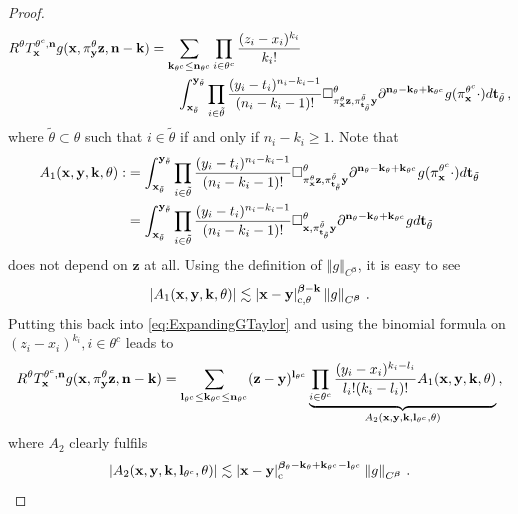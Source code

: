 \documentclass[12pt]{article}
\numberwithin{equation}{section}
\theoremstyle{plain}
\theoremstyle{definition}
\newcommand{\abs}[1]{\left\vert #1 \right\vert}
\newcommand{\norm}[1]{\left\Vert #1\right\Vert}
\def\fk{\mathbf k}\def\fl{\mathbf l}
\def\fy{\mathbf y}\def\fz{\mathbf z}
\def\fbeta{{\boldsymbol\beta}}
\begin{document}
\begin{proof}
    \begin{align}\begin{split}\label{eq:ExpandingGTaylor}
        R^\theta T_\fx^{\theta^c,\fn} g(\fx,\pi^\theta_\fy \fz,\fn-\fk) &= \sum_{\fk_{\theta^c}\le\fn_{\theta^c}} \prod_{i\in\theta^c} \frac{(z_i-x_i)^{k_i}}{k_i!} \\&\qquad\int_{\fx_{\tilde\theta}}^{\fy_{\tilde\theta}} \prod_{i\in\tilde\theta} \frac{(y_i-t_i)^{n_i-k_i-1}}{(n_i-k_i-1)!} \square^\theta_{\pi_\fx^\theta\fz,\pi_{\ft_{\tilde\theta}}^{\tilde\theta}\fy} \partial^{\fn_\theta-\fk_{\theta}+\fk_{\theta^c}}g(\pi_\fx^{\theta^c}\cdot)d\ft_{\tilde\theta}\,,
    \end{split}\end{align}
    where $\tilde\theta\subset\theta$ such that $i\in\tilde\theta$ if and only if $n_i-k_i\ge 1$. Note that
    \begin{align*}
        A_1(\fx,\fy,\fk,\theta) :&= \int_{\fx_{\tilde\theta}}^{\fy_{\tilde\theta}} \prod_{i\in\tilde\theta} \frac{(y_i-t_i)^{n_i-k_i-1}}{(n_i-k_i-1)!} \square^\theta_{\pi_\fx^\theta\fz,\pi_{\ft_{\tilde\theta}}^{\tilde\theta}\fy} \partial^{\fn_\theta-\fk_\theta+\fk_{\theta^c}}g(\pi_\fx^{\theta^c}\cdot)d\ft_{\tilde\theta}\\
        &=\int_{\fx_{\tilde\theta}}^{\fy_{\tilde\theta}} \prod_{i\in\tilde\theta} \frac{(y_i-t_i)^{n_i-k_i-1}}{(n_i-k_i-1)!} \square^\theta_{\fx,\pi_{\ft_{\tilde\theta}}^{\tilde\theta}\fy} \partial^{\fn_\theta-\fk_\theta+\fk_{\theta^c}}gd\ft_{\tilde\theta}
    \end{align*}
    does not depend on $\fz$ at all. Using the definition of $\norm{g}_{C^\fbeta}$, it is easy to see
    \[
        \abs{A_1(\fx,\fy,\fk,\theta)} \lesssim \abs{\fx-\fy}^{\fbeta-\fk}_{\text{c},\theta} \norm{g}_{C^\fbeta}\,.
    \]
    Putting this back into \eqref{eq:ExpandingGTaylor} and using the binomial formula on $(z_i-x_i)^{k_i}, i\in\theta^c$ leads to
    \begin{equation}\label{def_A_2}
        R^\theta T_\fx^{\theta^c,\fn} g(\fx,\pi^\theta_\fy \fz,\fn-\fk) = \sum_{\fl_{\theta^c}\le\fk_{\theta^c}\le\fn_{\theta^c}} (\fz-\fy)^{\fl_{\theta^c}}\underbrace{\prod_{i\in\theta^c} \frac{(y_i-x_i)^{k_i-l_i}}{l_i! (k_i-l_i)!}A_1(\fx,\fy,\fk,\theta)}_{A_2(\fx,\fy,\fk,\fl_{\theta^c},\theta)}\,,
    \end{equation}
    where $A_2$ clearly fulfils
    \[
    \abs{A_2(\fx,\fy,\fk,\fl_{\theta^c},\theta)} \lesssim \abs{\fx-\fy}^{\fbeta_\theta-\fk_\theta+\fk_{\theta^c}-\fl_{\theta^c}}_{\text{c}} \norm{g}_{C^\fbeta}\,.
    \]

\end{proof}
\end{document}
